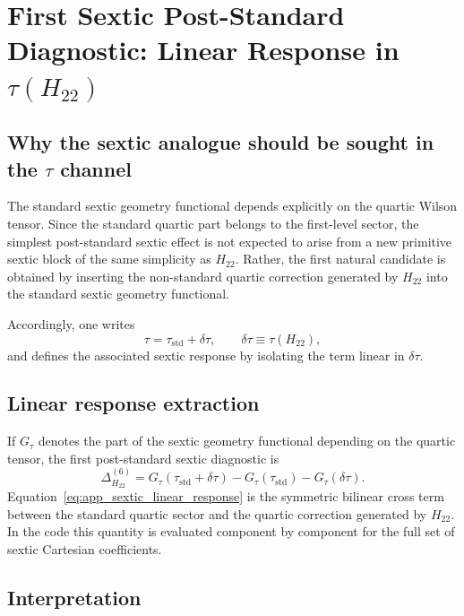 \documentclass[journal=jacsat,manuscript=article]{achemso}
\begin{document}
\section{First Sextic Post-Standard Diagnostic: Linear Response in \texorpdfstring{$\tau(H_{22})$}{tau(H22)}}

\subsection{Why the sextic analogue should be sought in the \texorpdfstring{$\tau$}{tau} channel}

The standard sextic geometry functional depends explicitly on the quartic
Wilson tensor. Since the standard quartic part belongs to the first-level
sector, the simplest post-standard sextic effect is not expected to arise from
a new primitive sextic block of the same simplicity as $H_{22}$. Rather, the
first natural candidate is obtained by inserting the non-standard quartic
correction generated by $H_{22}$ into the standard sextic geometry functional.

Accordingly, one writes
\begin{equation}
\tau = \tau_{\mathrm{std}} + \delta\tau,
\qquad
\delta\tau \equiv \tau(H_{22}),
\end{equation}
and defines the associated sextic response by isolating the term linear in
$\delta\tau$.

\subsection{Linear response extraction}

If $G_\tau$ denotes the part of the sextic geometry functional depending on the
quartic tensor, the first post-standard sextic diagnostic is
\begin{equation}
\Delta^{(6)}_{H_{22}}
=
G_\tau(\tau_{\mathrm{std}}+\delta\tau)
-G_\tau(\tau_{\mathrm{std}})
-G_\tau(\delta\tau).
\label{eq:app_sextic_linear_response}
\end{equation}
Equation~\eqref{eq:app_sextic_linear_response} is the symmetric bilinear cross
term between the standard quartic sector and the quartic correction generated
by $H_{22}$. In the code this quantity is evaluated component by component for
the full set of sextic Cartesian coefficients.

\subsection{Interpretation}
\end{document}
